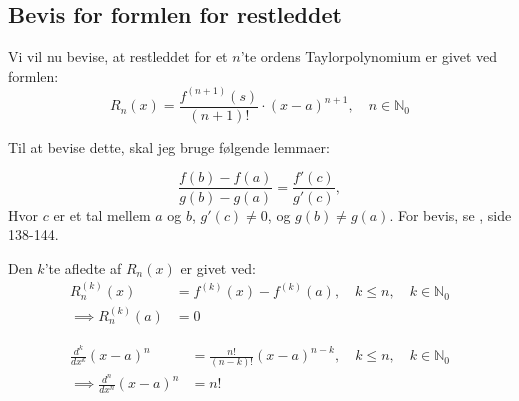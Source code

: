 \subsection{Bevis for formlen for restleddet}
Vi vil nu bevise, at restleddet for et $n$'te ordens Taylorpolynomium er givet ved formlen:
\begin{equation}
	R_n(x)=\frac{f^{(n+1)}(s)}{(n+1)!} \cdot (x-a)^{n+1}, \quad n \in \mathbb{N}_0
\end{equation}

Til at bevise dette, skal jeg bruge følgende lemmaer:
\begin{lem}
\label{generel_mvs}
	\begin{equation*}
		\frac{f(b)-f(a)}{g(b)-g(a)}=\frac{f'(c)}{g'(c)},
	\end{equation*}
	Hvor $c$ er et tal mellem $a$ og $b$, $g'(c) \neq 0$, og $g(b) \neq g(a)$. For bevis, se \cite{calc_et}, side 138-144.
\end{lem}

\begin{lem}
\label{rest_dif}
	Den $k$'te afledte af $R_n(x)$ er givet ved:
	\begin{align*}
		R_n^{(k)}(x)&=f^{(k)}(x)-f^{(k)}(a), \quad k \leq n, \quad k \in \mathbb{N}_0 \\
		\implies R_n^{(k)}(a)&=0
	\end{align*}	
\end{lem}

\begin{lem}
\label{potens_dif}
	\begin{align}
		\frac{d^k}{dx^k}(x-a)^n&=\frac{n!}{(n-k)!}(x-a)^{n-k}, \quad k \leq n, \quad k \in \mathbb{N}_0 \\
		\implies \frac{d^n}{dx^n}(x-a)^n&=n!
	\end{align}
\end{lem}



